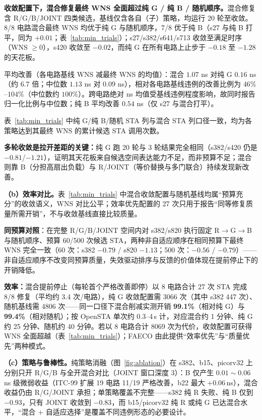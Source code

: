 \documentclass[journal]{IEEEtran}
\begin{document}
\textbf{收敛配置下，混合修复最终 WNS 全面超过纯 G / 纯 B / 随机顺序。}混合修复含 R/G/B/JOINT 四类候选，基线仅含各自（子）策略，均运行 20 轮至收敛。8/8 电路混合最终 WNS 均优于纯 G 与随机顺序，7/8 优于纯 B（s27 与纯 B 打平，同为 $+0.01$；表~\ref{tab:min_trials}）；s27/s382/s641/s713 收敛至满足时序（WNS $\ge 0$），s420 收敛至 $-0.02$，而纯 G 在所有电路上止步于 $-0.18$ 至 $-1.28$ 的天花板。

平均改善（各电路基线 WNS 减最终 WNS 的均值）：混合 $1.07$ ns 对纯 G $0.16$ ns（约 6.7 倍；中位数 $1.13$ ns 对 $0.09$ ns），相对各电路基线违例的改善比例为 $46\%$--$104\%$（中位数约 $100\%$）。跨电路绝对 ns 均值受基线违例程度影响，故同时报告归一化比例与中位数；纯 B 平均改善 $0.54$ ns（仅 s27 与混合打平）。

表~\ref{tab:min_trials} 中纯 G/纯 B/随机 STA 列与混合 STA 列口径一致，均为各策略达到其最终 WNS 的累计候选 STA 调用次数。

\textbf{多轮收敛是拉开差距的关键：}纯 G 跑 20 轮与 3 轮结果完全相同（s382/s420 仍是 $-0.81$/$-1.21$），证明其天花板来自候选空间表达能力不足，而非预算不足；混合则靠 B（分担高扇出负载）与 R/JOINT（等价替换与多门联合）持续发现新改善。

\textbf{（b）效率对比。}表~\ref{tab:min_trials} 中混合收敛配置与随机基线均属“预算充分”的收敛语义，WNS 对比公平；效率优先配置的 27 次只用于报告“同等修复质量所需开销”，不与收敛基线直接比较质量。

\textbf{同预算对照}：在完整 R/G/B/JOINT 空间内对 s382/s820 执行固定 R$\rightarrow$G$\rightarrow$B 与随机顺序、预算 60/500 次候选 STA，两种非自适应顺序在相同预算下最终 WNS 完全一致（60 次：s382 $-0.79$ / s820 $-1.13$；500 次：$-0.56$ / $-0.79$）——非自适应顺序不改变同预算质量，失效驱动排序与反馈的价值体现在提前停止下的开销降低。

\textbf{效率：}混合提前停止（每轮首个严格改善即停）以 8 电路合计 27 次 STA 完成 8/8 修复（平均约 3.4 次/电路），纯 G 收敛配置需 3066 次（其中 s382 447 次）、随机基线需 4806 次——同一口径下混合削减实测开销 \textbf{99.1\%}（相对纯 G）与 \textbf{99.4\%}（相对随机）；按 OpenSTA 单次约 0.3--4\,s 计，对应混合约 1 分钟、纯 G 约 25 分钟、随机约 40 分钟。若以 8 电路合计 8069 次为代价，收敛配置可获得 WNS 全面超越（表~\ref{tab:min_trials}）；FAECO 由此提供“效率优先”与“质量优先”两种模式。

\textbf{（c）策略与鲁棒性。}纯策略消融（图~\ref{fig:ablation}）在 s382、b15、picorv32 上分别只开 R/G/B 与全开混合对比（JOINT 窗口深度 3）：B 仅产生 $0.01\!\sim\!0.06\,$ns 级微弱收益（ITC-99 扩展 19 电路 11/19 严格改善，b22 最大 $+0.06\,$ns），混合收益仍由 R/G/JOINT 承担；单策略覆盖不完整——s382 纯 R 失败、纯 B 仅到 $-0.93$，只有 JOINT 收敛到 $-0.83$，而 b15/picorv32 纯 R 或纯 G 已达混合水平，“混合 + 自适应选择”是覆盖不同违例形态的必要设计。
\end{document}
